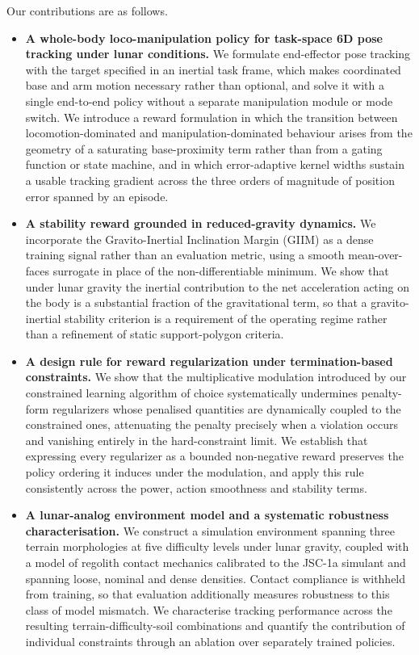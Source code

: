 Our contributions are as follows.

\begin{itemize}
    \item \textbf{A whole-body loco-manipulation policy for task-space 6D pose tracking under lunar conditions.} We formulate end-effector pose tracking with the target specified in an inertial task frame, which makes coordinated base and arm motion necessary rather than optional, and solve it with a single end-to-end policy without a separate manipulation module or mode switch. We introduce a reward formulation in which the transition between locomotion-dominated and manipulation-dominated behaviour arises from the geometry of a saturating base-proximity term rather than from a gating function or state machine, and in which error-adaptive kernel widths sustain a usable tracking gradient across the three orders of magnitude of position error spanned by an episode.

    \item \textbf{A stability reward grounded in reduced-gravity dynamics.} We incorporate the Gravito-Inertial Inclination Margin (GIIM) as a dense training signal rather than an evaluation metric, using a smooth mean-over-faces surrogate in place of the non-differentiable minimum. We show that under lunar gravity the inertial contribution to the net acceleration acting on the body is a substantial fraction of the gravitational term, so that a gravito-inertial stability criterion is a requirement of the operating regime rather than a refinement of static support-polygon criteria.

    \item \textbf{A design rule for reward regularization under termination-based constraints.} We show that the multiplicative modulation introduced by our constrained learning algorithm of choice systematically undermines penalty-form regularizers whose penalised quantities are dynamically coupled to the constrained ones, attenuating the penalty precisely when a violation occurs and vanishing entirely in the hard-constraint limit. We establish that expressing every regularizer as a bounded non-negative reward preserves the policy ordering it induces under the modulation, and apply this rule consistently across the power, action smoothness and stability terms.

    \item \textbf{A lunar-analog environment model and a systematic robustness characterisation.} We construct a simulation environment spanning three terrain morphologies at five difficulty levels under lunar gravity, coupled with a model of regolith contact mechanics calibrated to the JSC-1a simulant and spanning loose, nominal and dense densities. Contact compliance is withheld from training, so that evaluation additionally measures robustness to this class of model mismatch. We characterise tracking performance across the resulting terrain-difficulty-soil combinations and quantify the contribution of individual constraints through an ablation over separately trained policies.
\end{itemize}

